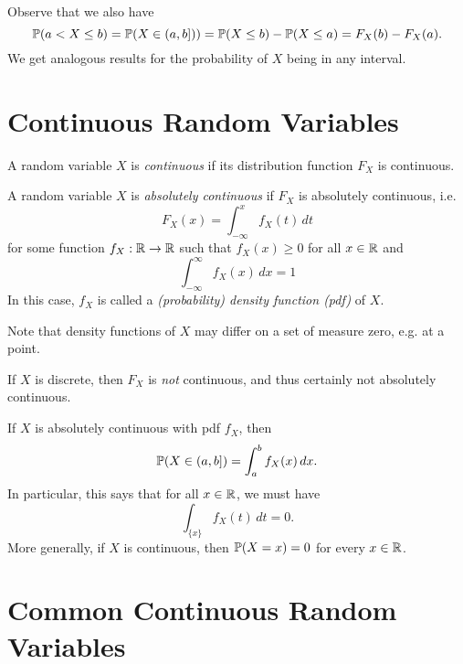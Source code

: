 \begin{remark}
  Observe that we also have
  \[
    \mathbb{P}(a < X \le b)
    = \mathbb{P}(X \in (a, b]))
    = \mathbb{P}(X \le b) - \mathbb{P}(X \le a)
    = F_X(b) - F_X(a).
  \]
  We get analogous results for the probability
  of $X$ being in any interval.
\end{remark}

\section{Continuous Random Variables}
\begin{definition}
  A random variable $X$ is
  \emph{continuous} if its distribution function
  $F_X$ is continuous.
\end{definition}

\begin{definition}
  A random variable $X$ is \emph{absolutely continuous}
  if $F_X$ is absolutely continuous, i.e.
  \[
    F_X(x) = \int_{-\infty}^x f_X(t) \, dt
  \]
  for some function $f_X : \mathbb{R} \to \mathbb{R}$ such that
  $f_X(x) \ge 0$ for all $x \in \mathbb{R}$ and
  \[\int_{-\infty}^\infty f_X(x) \, dx = 1\]
  In this case, $f_X$ is called a
  \emph{(probability) density function (pdf)} of $X$.
\end{definition}

\begin{remark}
  Note that density functions of $X$ may differ
  on a set of measure zero, e.g. at a point.
\end{remark}

\begin{remark}
  If $X$ is discrete, then $F_X$ is
  \emph{not} continuous, and thus certainly
  not absolutely continuous.
\end{remark}

\begin{remark}
  If $X$ is absolutely continuous with pdf
  $f_X$, then
  \[
    \mathbb{P}(X \in (a, b]) = \int_a^b f_X(x) \, dx.
  \]
  In particular, this says that for all $x \in \mathbb{R}$,
  we must have
  \[
    \int_{\{x\}} f_X(t) \, dt = 0.
  \]
  More generally, if $X$ is continuous, then
  $\mathbb{P}(X = x) = 0$ for every $x \in \mathbb{R}$.
\end{remark}

\section{Common Continuous Random Variables}

